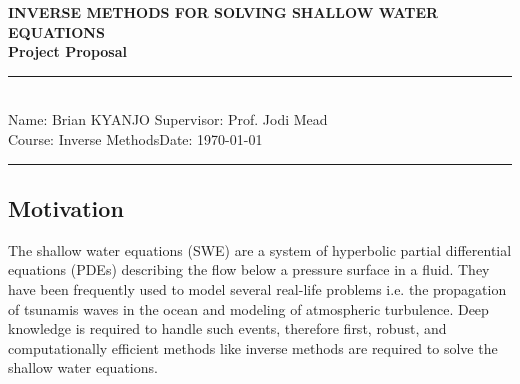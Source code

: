 \documentclass[11pt,a4paper]{article}
\newcommand{\student}{Brian KYANJO }
\newcommand{\course}{Inverse Methods}
\newcommand{\assignment}{ Prof. Jodi Mead}
\begin{document}
	
	\thispagestyle{empty}
	\begin{center}
		\textbf{INVERSE METHODS FOR SOLVING SHALLOW WATER  EQUATIONS \\[0.5cm]
			Project Proposal}
		\vspace{.2cm}
	\end{center}
	
	\noindent
	\rule{17cm}{0.2cm}\\[0.3cm]
	Name: \student \hfill Supervisor: \assignment\\[0.1cm]
	Course: \course \hfill Date: \today\\
	\rule{17cm}{0.05cm}
	\vspace{.2cm}
	
	\subsection*{Motivation}
	The shallow water  equations (SWE) are a system of hyperbolic partial differential equations (PDEs) describing the flow below a pressure surface in a fluid. They have been frequently used to model several real-life problems i.e. the propagation of tsunamis waves in the ocean \citep{dias2007dynamics} and modeling of atmospheric turbulence. Deep knowledge is required to handle such events, therefore first, robust, and computationally efficient methods like inverse methods are required to solve the shallow water equations.
	
\end{document}
